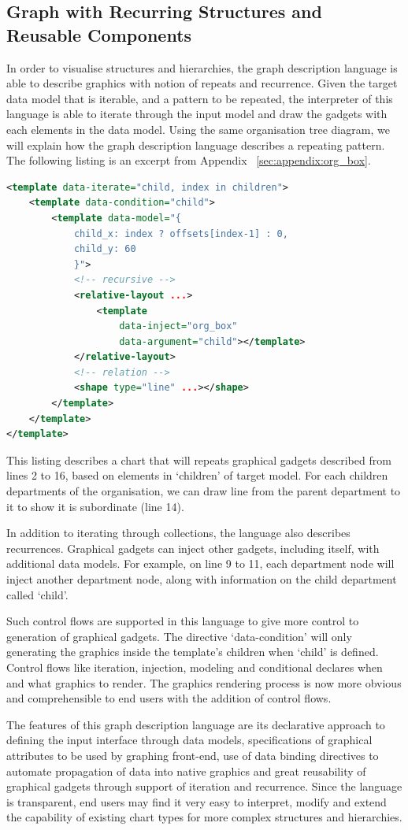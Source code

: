 \documentclass[11pt, a4paper]{report}
\begin{document}
\subsection{Graph with Recurring Structures and Reusable Components}
In order to visualise structures and hierarchies, the graph description language is able to describe graphics with notion of repeats and recurrence. Given the target data model that is iterable, and a pattern to be repeated, the interpreter of this language is able to iterate through the input model and draw the gadgets with each elements in the data model. Using the same organisation tree diagram, we will explain how the graph description language describes a repeating pattern. The following listing is an excerpt from Appendix ~\ref{sec:appendix:org_box}.
\begin{lstlisting}[language=xml]
<template data-iterate="child, index in children">
	<template data-condition="child">
		<template data-model="{
			child_x: index ? offsets[index-1] : 0,
			child_y: 60
			}">
			<!-- recursive -->
			<relative-layout ...>
				<template
					data-inject="org_box"
					data-argument="child"></template>
			</relative-layout>
			<!-- relation -->
			<shape type="line" ...></shape>
		</template>
	</template>
</template>
\end{lstlisting}
This listing describes a chart that will repeats graphical gadgets described from lines 2 to 16, based on elements in `children' of target model. For each children departments of the organisation, we can draw line from the parent department to it to show it is subordinate (line 14).

In addition to iterating through collections, the language also describes recurrences. Graphical gadgets can inject other gadgets, including itself, with additional data models. For example, on line 9 to 11, each department node will inject another department node, along with information on the child department called `child'.

Such control flows are supported in this language to give more control to generation of graphical gadgets. The directive `data-condition' will only generating the graphics inside the template's children when `child' is defined. Control flows like iteration, injection, modeling and conditional declares when and what graphics to render. The graphics rendering process is now more obvious and comprehensible to end users with the addition of control flows.

The features of this graph description language are its declarative approach to defining the input interface through data models, specifications of graphical attributes to be used by graphing front-end, use of data binding directives to automate propagation of data into native graphics and great reusability of graphical gadgets through support of iteration and recurrence. Since the language is transparent, end users may find it very easy to interpret, modify and extend the capability of existing chart types for more complex structures and hierarchies.
\end{document}
